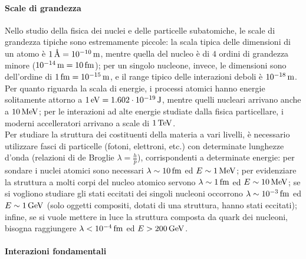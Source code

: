 
\paragraph{Scale di grandezza}

Nello studio della fisica dei nuclei e delle particelle subatomiche, le scale di grandezza tipiche sono estremamente piccole: la scala tipica delle dimensioni di un atomo è $ 1\,\text{\AA} = 10^{-10}\,\mathrm{m}  $, mentre quella del nucleo è di $ 4 $ ordini di grandezza minore ($ 10^{-14}\,\mathrm{m} = 10\,\mathrm{fm} $); per un singolo nucleone, invece, le dimensioni sono dell'ordine di $ 1\,\mathrm{fm} = 10^{-15}\,\mathrm{m} $, e il range tipico delle interazioni deboli è $ 10^{-18}\,\mathrm{m} $.\\
Per quanto riguarda la scala di energie, i processi atomici hanno energie solitamente attorno a $ 1\,\mathrm{eV} = 1.602\cdot10^{-19}\,\text{J} $, mentre quelli nucleari arrivano anche a $ 10\,\mathrm{MeV} $; per le interazioni ad alte energie studiate dalla fisica particellare, i moderni accelleratori arrivano a scale di $ 1\,\mathrm{TeV} $.\\
Per studiare la struttura dei costituenti della materia a vari livelli, è necessario utilizzare fasci di particelle (fotoni, elettroni, etc.) con determinate lunghezze d'onda (relazioni di de Broglie $ \lambda = \frac{h}{p} $), corrispondenti a determinate energie: per sondare i nuclei atomici sono necessari $ \lambda \sim 10\,\mathrm{fm} $ ed $ E \sim 1\,\mathrm{MeV} $; per evidenziare la struttura a molti corpi del nucleo atomico servono $ \lambda \sim 1\,\mathrm{fm} $ ed $ E \sim 10\,\mathrm{MeV} $; se si vogliono studiare gli stati eccitati dei singoli nucleoni occorrono $ \lambda \sim 10^{-3}\,\mathrm{fm} $ ed $ E \sim 1\,\mathrm{GeV} $ (solo oggetti compositi, dotati di una struttura, hanno stati eccitati); infine, se si vuole mettere in luce la struttura composta da quark dei nucleoni, bisogna raggiungere $ \lambda < 10^{-4}\,\mathrm{fm} $ ed $ E > 200\,\mathrm{GeV} $.

\paragraph{Interazioni fondamentali}

